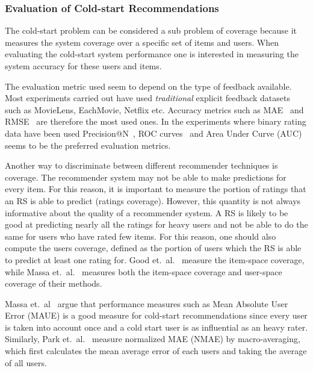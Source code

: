 \subsubsection{Evaluation of Cold-start Recommendations}

The cold-start problem can be considered a sub problem of coverage because it
measures the system coverage over a specific set of items and users. When
evaluating the cold-start system performance one is interested in measuring the
system accuracy for these users and items.

The evaluation metric used seem to depend on the type of feedback available.
Most experiments carried out have used \emph{traditional} explicit feedback datasets such as
MovieLens, EachMovie, Netflix etc. Accuracy metrics such as MAE~\cite{Rashid2002, Rashid2008, Massa2004,
Massa2007, Stern2009} and RMSE~\cite{Agarwal2009, Agarwal2010} are therefore
the most used ones. In the experiments where binary rating data have been used
Precision@N~\cite{Liu2011, Gantner2010}, ROC curves~\cite{Agarwal2009,
Gantner2010, Schein2002} and Area Under Curve (AUC) \cite{Liu2011, Gantner2010} seems to be the
preferred evaluation metrics.

Another way to discriminate between different recommender techniques is
coverage. The recommender system may not be able to make predictions for every
item. For this reason, it is important to measure the portion of ratings that
an RS is able to predict (ratings coverage). However, this quantity is not
always informative about the quality of a recommender system. A RS is likely to
be good at predicting nearly all the ratings for heavy users and not be able to
do the same for users who have rated few items. For this reason, one should
also compute the users coverage, defined as the portion of users which the RS
is able to predict at least one rating for. Good et.\ al.~\cite{Good1999}
measure the item-space coverage, while Massa et.\ al.~\cite{Massa2004,
Massa2007} measures both the item-space coverage and user-space coverage of
their methods.

Massa et.\ al~\cite{Massa2004} argue that performance measures such as Mean
Absolute User Error (MAUE) is a good measure for cold-start recommendations
since every user is taken into account once and a cold start user is as
influential as an heavy rater. Similarly, Park et.\ al.~\cite{Park2006} measure
normalized MAE (NMAE) by macro-averaging, which first calculates the mean
average error of each users and taking the average of all users.

